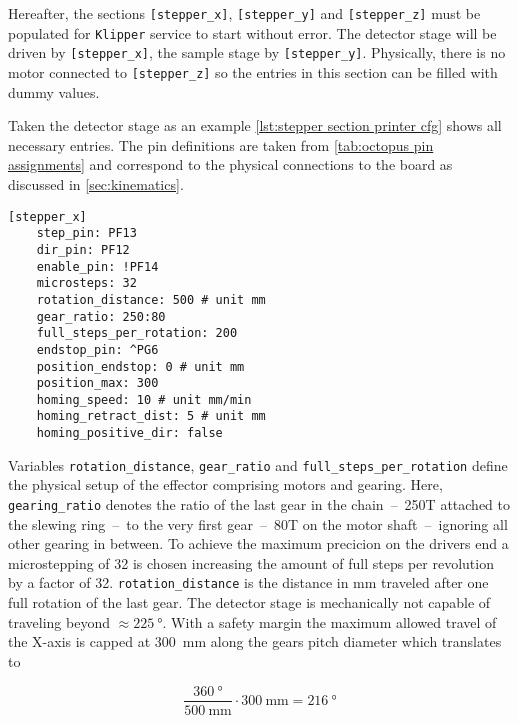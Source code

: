         Hereafter, the sections \texttt{[stepper\_x]}, \texttt{[stepper\_y]} and \texttt{[stepper\_z]} must be populated for \texttt{Klipper} service to start without error.
        The detector stage will be driven by \texttt{[stepper\_x]}, the sample stage by \texttt{[stepper\_y]}.
        Physically, there is no motor connected to \texttt{[stepper\_z]} so the entries in this section can be filled with dummy values.

        Taken the detector stage as an example \cref{lst:stepper section printer cfg} shows all necessary entries.
        The pin definitions are taken from \cref{tab:octopus pin assignments} and correspond to the physical connections to the board as discussed in \cref{sec:kinematics}.

        \begin{lstlisting}[style=mydjango, firstnumber=16,
            caption={[Example stepper section of \texttt{printer.cfg}]Example stepper section of \texttt{printer.cfg}.},
            label={lst:stepper section printer cfg}%
            ]
    [stepper_x]
    step_pin: PF13
    dir_pin: PF12
    enable_pin: !PF14
    microsteps: 32
    rotation_distance: 500 # unit mm
    gear_ratio: 250:80
    full_steps_per_rotation: 200
    endstop_pin: ^PG6
    position_endstop: 0 # unit mm
    position_max: 300
    homing_speed: 10 # unit mm/min
    homing_retract_dist: 5 # unit mm
    homing_positive_dir: false
        \end{lstlisting}

        Variables \texttt{rotation\_distance}, \texttt{gear\_ratio} and \texttt{full\_steps\_per\_rotation} define the physical setup of the effector comprising motors and gearing.
        Here, \texttt{gearing\_ratio} denotes the ratio of the last gear in the chain~--~250T attached to the slewing ring~--~to the very first gear~--~80T on the motor shaft~--~ignoring all other gearing in between.
        To achieve the maximum precicion on the drivers end a microstepping of 32 is chosen increasing the amount of full steps per revolution by a factor of 32.
        \texttt{rotation\_distance} is the distance in \unit{\milli\meter} traveled after one full rotation of the last gear.
        The detector stage is mechanically not capable of traveling beyond \(\approx \qty{225}{\degree}\).
        With a safety margin the maximum allowed travel of the X-axis is capped at \qty{300}{\milli\metre} along the gears pitch diameter which translates to

        \begin{equation}
            \frac{\qty{360}{\degree}}{\qty{500}{\milli\metre}} \cdot \qty{300}{\milli\metre} = \qty{216}{\degree}
            \label{eq:position max}
        \end{equation}
        
